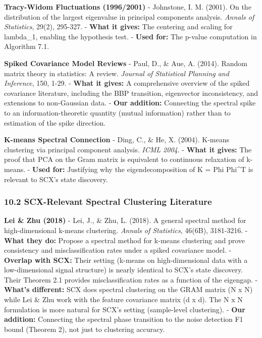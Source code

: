 \documentclass[
  12pt,
]{article}
\begin{document}
\textbf{Tracy-Widom Fluctuations (1996/2001)} - Johnstone, I. M. (2001).
On the distribution of the largest eigenvalue in principal components
analysis. \emph{Annals of Statistics}, 29(2), 295-327. - \textbf{What it
gives:} The centering and scaling for lambda\_1, enabling the hypothesis
test. - \textbf{Used for:} The p-value computation in Algorithm 7.1.

\textbf{Spiked Covariance Model Reviews} - Paul, D., \& Aue, A. (2014).
Random matrix theory in statistics: A review. \emph{Journal of
Statistical Planning and Inference}, 150, 1-29. - \textbf{What it
gives:} A comprehensive overview of the spiked covariance literature,
including the BBP transition, eigenvector inconsistency, and extensions
to non-Gaussian data. - \textbf{Our addition:} Connecting the spectral
spike to an information-theoretic quantity (mutual information) rather
than to estimation of the spike direction.

\textbf{K-means Spectral Connection} - Ding, C., \& He, X. (2004).
K-means clustering via principal component analysis. \emph{ICML 2004}. -
\textbf{What it gives:} The proof that PCA on the Gram matrix is
equivalent to continuous relaxation of k-means. - \textbf{Used for:}
Justifying why the eigendecomposition of K = Phi Phi\^{}T is relevant to
SCX's state discovery.

\subsubsection{10.2 SCX-Relevant Spectral Clustering
Literature}\label{scx-relevant-spectral-clustering-literature}

\textbf{Lei \& Zhu (2018)} - Lei, J., \& Zhu, L. (2018). A general
spectral method for high-dimensional k-means clustering. \emph{Annals of
Statistics}, 46(6B), 3181-3216. - \textbf{What they do:} Propose a
spectral method for k-means clustering and prove consistency and
misclassification rates under a spiked covariance model. -
\textbf{Overlap with SCX:} Their setting (k-means on high-dimensional
data with a low-dimensional signal structure) is nearly identical to
SCX's state discovery. Their Theorem 2.1 provides misclassification
rates as a function of the eigengap. - \textbf{What's different:} SCX
does spectral clustering on the GRAM matrix (N x N) while Lei \& Zhu
work with the feature covariance matrix (d x d). The N x N formulation
is more natural for SCX's setting (sample-level clustering). -
\textbf{Our addition:} Connecting the spectral phase transition to the
noise detection F1 bound (Theorem 2), not just to clustering accuracy.
\end{document}
